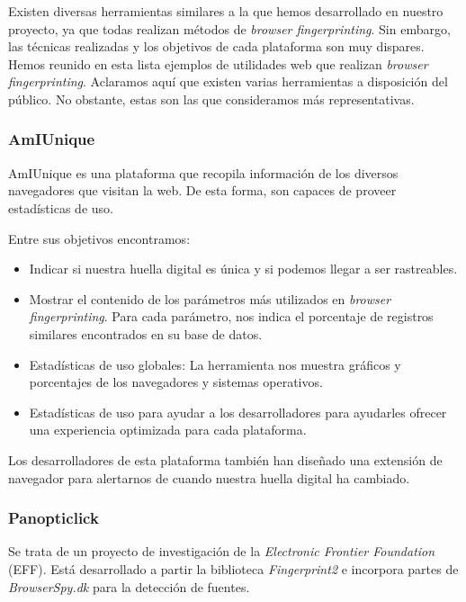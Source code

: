 Existen diversas herramientas similares a la que hemos desarrollado en nuestro proyecto, ya que todas realizan métodos de \textit{browser fingerprinting}. Sin embargo, las técnicas realizadas y los objetivos de cada plataforma son muy dispares. Hemos reunido en esta lista ejemplos de utilidades web que realizan \textit{browser fingerprinting}. Aclaramos aquí que existen varias herramientas a disposición del público. No obstante, estas son las que consideramos más representativas. \par

\subsubsection{AmIUnique}

AmIUnique\cite{amiunique} es una plataforma que recopila información de los diversos navegadores que visitan la web. De esta forma, son capaces de proveer estadísticas de uso. \par 
Entre sus objetivos encontramos:
\begin{itemize}
	\item Indicar si nuestra huella digital es única y si podemos llegar a ser rastreables.
	\item Mostrar el contenido de los parámetros más utilizados en \textit{browser fingerprinting}. Para cada parámetro, nos indica el porcentaje de registros similares encontrados en su base de datos.
	\item Estadísticas de uso globales: La herramienta nos muestra gráficos y porcentajes de los navegadores y sistemas operativos.
	\item Estadísticas de uso para ayudar a los desarrolladores para ayudarles ofrecer una experiencia optimizada para cada plataforma.
\end{itemize}

Los desarrolladores de esta plataforma también han diseñado una extensión de navegador para alertarnos de cuando nuestra huella digital ha cambiado. \par 

\subsubsection{Panopticlick}

Se trata de un proyecto de investigación de la \textit{Electronic Frontier Foundation} (EFF). Está desarrollado a partir la biblioteca \textit{Fingerprint2}\cite{fingerprintjs2} e incorpora partes de \textit{BrowserSpy.dk}\cite{browserSpy} para la detección de fuentes. \par 

